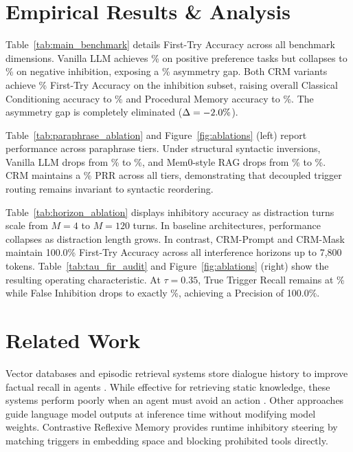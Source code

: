 \documentclass[10pt,conference]{IEEEtran}
\begin{document}


\section{Empirical Results \& Analysis}

Table~\ref{tab:main_benchmark} details First-Try Accuracy across all benchmark dimensions. Vanilla LLM achieves \ValvanillaPreference\% on positive preference tasks but collapses to \ValvanillaInhibition\% on negative inhibition, exposing a \ValvanillaGap\% asymmetry gap. Both CRM variants achieve \ValcrmpromptInhibition\% First-Try Accuracy on the inhibition subset, raising overall Classical Conditioning accuracy to \ValcrmpromptClassical\% and Procedural Memory accuracy to \ValcrmpromptProcedural\%. The asymmetry gap is completely eliminated ($\Delta = -2.0\%$).



Table~\ref{tab:paraphrase_ablation} and Figure~\ref{fig:ablations} (left) report performance across paraphrase tiers. Under structural syntactic inversions, Vanilla LLM drops from \ValParavanillaExact\% to \ValParavanillaStructural\%, and Mem0-style RAG drops from \ValParamemZeroragExact\% to \ValParamemZeroragStructural\%. CRM maintains a \ValParacrmpromptPRR\% PRR across all tiers, demonstrating that decoupled trigger routing remains invariant to syntactic reordering.



Table~\ref{tab:horizon_ablation} displays inhibitory accuracy as distraction turns scale from $M=4$ to $M=120$ turns. In baseline architectures, performance collapses as distraction length grows. In contrast, CRM-Prompt and CRM-Mask maintain 100.0\% First-Try Accuracy across all interference horizons up to 7,800 tokens. Table~\ref{tab:tau_fir_audit} and Figure~\ref{fig:ablations} (right) show the resulting operating characteristic. At $\tau = 0.35$, True Trigger Recall remains at \ValOptimalTauRecall\% while False Inhibition drops to exactly \ValOptimalTauFIR\%, achieving a Precision of 100.0\%.

\section{Related Work}

Vector databases and episodic retrieval systems store dialogue history to improve factual recall in agents \citep{packer2023memgpt,chhikara2024mem0}. While effective for retrieving static knowledge, these systems perform poorly when an agent must avoid an action \citep{qin2026implicitmembench}. Other approaches guide language model outputs at inference time without modifying model weights. Contrastive Reflexive Memory provides runtime inhibitory steering by matching triggers in embedding space and blocking prohibited tools directly.
\end{document}

